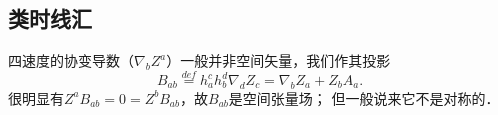 %
%
%
%
%
%
%
%
%
%






\subsection{类时线汇}\label{chfd:sec_tlc}
四速度的协变导数（$\nabla_b Z^a$）一般并非空间矢量，我们作其投影
\begin{equation}
    B_{ab} \overset{def}{=} h_a^c h_b^d \nabla_d Z_c
    =\nabla_b Z_a + Z_b A_a .
\end{equation}
很明显有$Z^a B_{ab}=0=Z^b B_{ab}$，故$B_{ab}$是空间张量场；
但一般说来它不是对称的．

